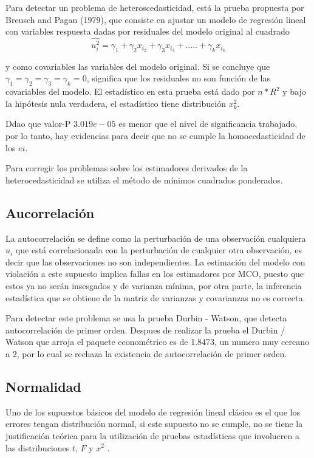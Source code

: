 \documentclass[11pt]{article}
\begin{document}
{ Para detectar un problema de heteroscedasticidad, está la prueba propuesta por Breusch and Pagan (1979), que consiste en ajustar un modelo de regresión lineal con variables respuesta dadas por residuales del modelo original al cuadrado
 $$ \hat{u_i^2} = \gamma_1 + \gamma_2 x_i _2 + \gamma_3 x_i _3 + ..... + \gamma_k x_i _k $$
 
 y como covariables las variables del modelo original. Si se concluye que  $ \gamma_1 = \gamma_2 = \gamma_3 = \gamma_k = 0 $, significa que los residuales no son función de las covariables del modelo. El estadístico en esta prueba está dado por  $n * R^2$  y bajo la hipótesis nula verdadera, el estadístico tiene distribución $x_k^2$.
 
 Ddao que valor-P $3.019e-05$ es menor que el nivel de significancia trabajado, por lo tanto, hay evidencias para decir que no se cumple la homocedasticidad de los $ei$.

 Para corregir los problemas sobre los estimadores derivados de la heterocedasticidad se utiliza el método de mínimos cuadrados ponderados.
 
\subsection{Aucorrelación}

La autocorrelación se define como la perturbación de una observación cualquiera $u_i$ que está correlacionada con la perturbación de cualquier otra observación, es decir que las observaciones no son independientes. La estimación del modelo con violación a este supuesto implica fallas en los estimadores por MCO, puesto que estos ya no serán insesgados y de varianza mínima, por otra parte, la inferencia estadística que se obtiene de la matriz de varianzas y covarianzas no es correcta.

Para detectar este problema se usa la prueba Durbin - Watson, que detecta autocorrelación de primer orden. Despues de realizar la prueba el Durbin / Watson que arroja el paquete econométrico es de 1.8473, un numero muy cercano a 2, por lo cual se rechaza la existencia de autocorrelación de primer orden.

\subsection{Normalidad}

Uno de los supuestos básicos del modelo de regresión lineal clásico es el que los errores tengan distribución normal, si este supuesto no se cumple, no se  tiene la justificación teórica para la utilización de pruebas estadísticas que involucren a las distribuciones $t$, $F$ y $x^2$ .
 
}
\end{document}
